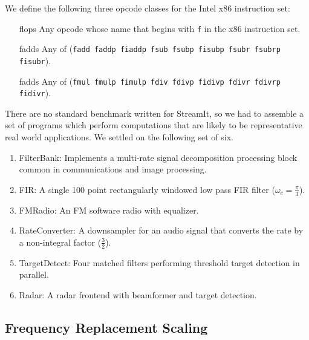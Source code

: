 We define the following three opcode classes for the Intel x86 instruction set:
\begin{itemize}
\item[flops] Any opcode whose name that begins with {\tt f} in the x86 instruction set.
\vspace{-6pt}
\item[fadds] Any of ({\tt fadd faddp fiaddp fsub fsubp fisubp fsubr fsubrp fisubr}).
\vspace{-6pt}
\item[fadds] Any of ({\tt fmul fmulp fimulp fdiv fdivp fidivp fdivr fdivrp fidivr}).
\vspace{-6pt}
\end{itemize}

There are no standard benchmark written for StreamIt, so we had to assemble
a set of programs which perform computations that are likely to be representative
real world applications. We settled on the following set of six.

\begin{enumerate}
\item FilterBank: Implements a multi-rate signal decomposition processing block common in communications and image processing.
\vspace{-6pt}

\item FIR: A single 100 point rectangularly windowed low pass FIR filter ($\omega_c=\frac{\pi}{3}$).
\vspace{-6pt}

\item FMRadio: An FM software radio with equalizer.
\vspace{-6pt}

\item RateConverter: A downsampler for an audio signal that converts
the rate by a non-integral factor ($\frac{3}{2}$).
\vspace{-6pt}

\item TargetDetect: Four matched filters performing threshold target
detection in parallel.
\vspace{-6pt}

\item Radar: A radar frontend with beamformer and target detection.
\vspace{-6pt}
\end{enumerate}

\subsection{Frequency Replacement Scaling}

